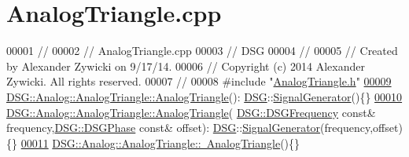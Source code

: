 \hypertarget{_analog_triangle_8cpp_source}{\section{Analog\+Triangle.\+cpp}
\label{_analog_triangle_8cpp_source}
}

\begin{DoxyCode}
00001 \textcolor{comment}{//}
00002 \textcolor{comment}{//  AnalogTriangle.cpp}
00003 \textcolor{comment}{//  DSG}
00004 \textcolor{comment}{//}
00005 \textcolor{comment}{//  Created by Alexander Zywicki on 9/17/14.}
00006 \textcolor{comment}{//  Copyright (c) 2014 Alexander Zywicki. All rights reserved.}
00007 \textcolor{comment}{//}
00008 \textcolor{preprocessor}{#include "\hyperlink{_analog_triangle_8h}{AnalogTriangle.h}"}
\hypertarget{_analog_triangle_8cpp_source_l00009}{}\hyperlink{class_d_s_g_1_1_analog_1_1_analog_triangle_a2fe1a7a29eb9472323a2a1c0d0696e55}{00009} \hyperlink{class_d_s_g_1_1_analog_1_1_analog_triangle_a2fe1a7a29eb9472323a2a1c0d0696e55}{DSG::Analog::AnalogTriangle::AnalogTriangle}():
      \hyperlink{namespace_d_s_g}{DSG}::\hyperlink{class_d_s_g_1_1_signal_generator}{SignalGenerator}()\{\}
\hypertarget{_analog_triangle_8cpp_source_l00010}{}\hyperlink{class_d_s_g_1_1_analog_1_1_analog_triangle_a75c0a8b20e1843b35de3944da11c75ed}{00010} \hyperlink{class_d_s_g_1_1_analog_1_1_analog_triangle_a2fe1a7a29eb9472323a2a1c0d0696e55}{DSG::Analog::AnalogTriangle::AnalogTriangle}(
      \hyperlink{namespace_d_s_g_a4315a061386fa1014fda09b15d3a6973}{DSG::DSGFrequency} \textcolor{keyword}{const}& frequency,\hyperlink{namespace_d_s_g_a44431ce1eb0a7300efdd207bc879e52c}{DSG::DSGPhase} \textcolor{keyword}{const}& offset):
      \hyperlink{namespace_d_s_g}{DSG}::\hyperlink{class_d_s_g_1_1_signal_generator}{SignalGenerator}(frequency,offset)\{\}
\hypertarget{_analog_triangle_8cpp_source_l00011}{}\hyperlink{class_d_s_g_1_1_analog_1_1_analog_triangle_af6e127d2fb623afad9b172e7c8b3c656}{00011} \hyperlink{class_d_s_g_1_1_analog_1_1_analog_triangle_af6e127d2fb623afad9b172e7c8b3c656}{DSG::Analog::AnalogTriangle::~AnalogTriangle}()\{\}
\end{DoxyCode}
